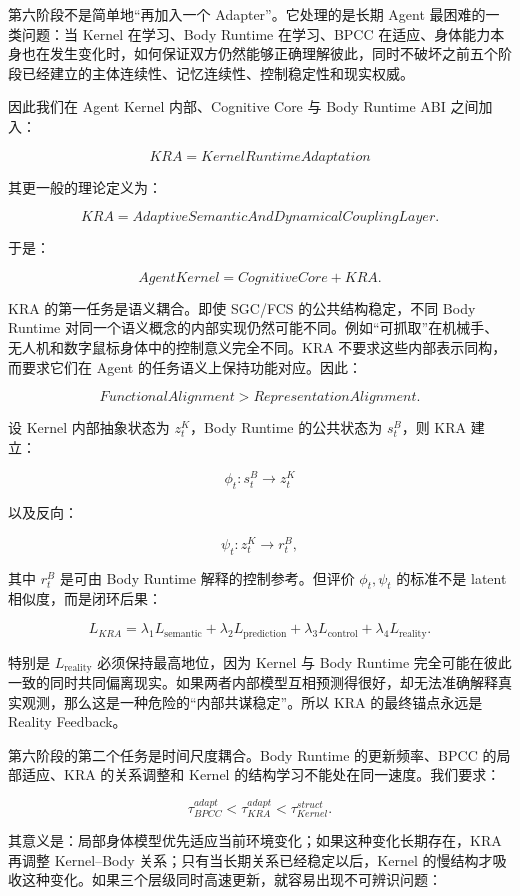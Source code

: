 第六阶段不是简单地“再加入一个 Adapter”。它处理的是长期 Agent 最困难的一类问题：当 Kernel 在学习、Body Runtime 在学习、BPCC 在适应、身体能力本身也在发生变化时，如何保证双方仍然能够正确理解彼此，同时不破坏之前五个阶段已经建立的主体连续性、记忆连续性、控制稳定性和现实权威。

因此我们在 Agent Kernel 内部、Cognitive Core 与 Body Runtime ABI 之间加入：

\[
\boxed{
KRA
=
KernelRuntimeAdaptation
}
\]

其更一般的理论定义为：

\[
\boxed{
KRA=
AdaptiveSemanticAndDynamicalCouplingLayer.
}
\]

于是：

\[
AgentKernel
=
CognitiveCore
+
KRA.
\]

KRA 的第一任务是语义耦合。即使 SGC/FCS 的公共结构稳定，不同 Body Runtime 对同一个语义概念的内部实现仍然可能不同。例如“可抓取”在机械手、无人机和数字鼠标身体中的控制意义完全不同。KRA 不要求这些内部表示同构，而要求它们在 Agent 的任务语义上保持功能对应。因此：

\[
\boxed{
FunctionalAlignment
>
RepresentationAlignment.
}
\]

设 Kernel 内部抽象状态为 \(z_t^K\)，Body Runtime 的公共状态为 \(s_t^B\)，则 KRA 建立：

\[
\phi_t:
s_t^B
\rightarrow
z_t^K
\]

以及反向：

\[
\psi_t:
z_t^K
\rightarrow
r_t^B,
\]

其中 \(r_t^B\) 是可由 Body Runtime 解释的控制参考。但评价 \(\phi_t,\psi_t\) 的标准不是 latent 相似度，而是闭环后果：

\[
L_{KRA}
=
\lambda_1 L_{\mathrm{semantic}}
+
\lambda_2 L_{\mathrm{prediction}}
+
\lambda_3 L_{\mathrm{control}}
+
\lambda_4 L_{\mathrm{reality}}.
\]

特别是 \(L_{\mathrm{reality}}\) 必须保持最高地位，因为 Kernel 与 Body Runtime 完全可能在彼此一致的同时共同偏离现实。如果两者内部模型互相预测得很好，却无法准确解释真实观测，那么这是一种危险的“内部共谋稳定”。所以 KRA 的最终锚点永远是 Reality Feedback。

第六阶段的第二个任务是时间尺度耦合。Body Runtime 的更新频率、BPCC 的局部适应、KRA 的关系调整和 Kernel 的结构学习不能处在同一速度。我们要求：

\[
\tau_{BPCC}^{adapt}
<
\tau_{KRA}^{adapt}
<
\tau_{Kernel}^{struct}.
\]

其意义是：局部身体模型优先适应当前环境变化；如果这种变化长期存在，KRA 再调整 Kernel--Body 关系；只有当长期关系已经稳定以后，Kernel 的慢结构才吸收这种变化。如果三个层级同时高速更新，就容易出现不可辨识问题：

